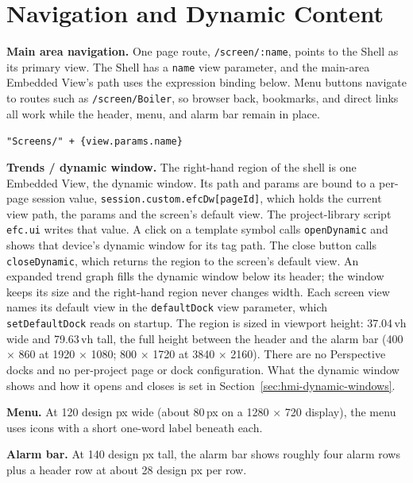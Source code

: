 \section{Navigation and Dynamic Content}
\textbf{Main area navigation.} One page route, \texttt{/screen/:name}, points to the Shell as its primary view. The Shell has a \texttt{name} view parameter, and the main-area Embedded View's path uses the expression binding below. Menu buttons navigate to routes such as \texttt{/screen/Boiler}, so browser back, bookmarks, and direct links all work while the header, menu, and alarm bar remain in place.
\begin{center}\texttt{"Screens/" + \{view.params.name\}}\end{center}

\textbf{Trends / dynamic window.} The right-hand region of the shell is one Embedded View, the dynamic window. Its path and params are bound to a per-page session value, \texttt{session.\allowbreak{}custom.\allowbreak{}efcDw[pageId]}, which holds the current view path, the params and the screen's default view. The project-library script \texttt{efc.ui} writes that value. A click on a template symbol calls \texttt{openDynamic} and shows that device's dynamic window for its tag path. The close button calls \texttt{closeDynamic}, which returns the region to the screen's default view. An expanded trend graph fills the dynamic window below its header; the window keeps its size and the right-hand region never changes width. Each screen view names its default view in the \texttt{defaultDock} view parameter, which \texttt{setDefaultDock} reads on startup. The region is sized in viewport height: 37.04\,vh wide and 79.63\,vh tall, the full height between the header and the alarm bar (400 $\times$ 860 at 1920 $\times$ 1080; 800 $\times$ 1720 at 3840 $\times$ 2160). There are no Perspective docks and no per-project page or dock configuration. What the dynamic window shows and how it opens and closes is set in Section~\ref{sec:hmi-dynamic-windows}. \newmark

\textbf{Menu.} At 120 design px wide (about 80\,px on a 1280 $\times$ 720 display), the menu uses icons with a short one-word label beneath each.

\textbf{Alarm bar.} At 140 design px tall, the alarm bar shows roughly four alarm rows plus a header row at about 28 design px per row.

